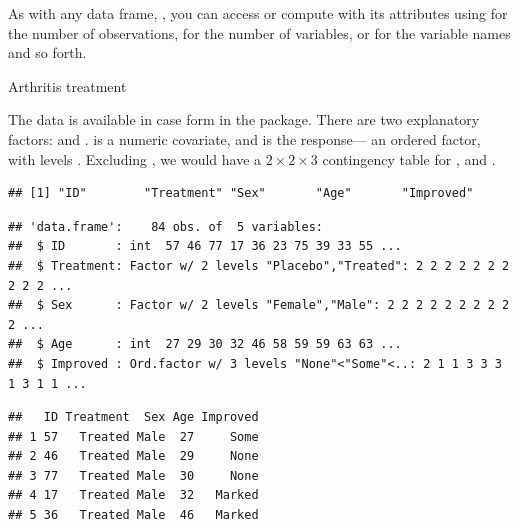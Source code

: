\documentclass[11pt]{book}
\renewenvironment{knitrout}{\small\renewcommand{\baselinestretch}{.85}}{} %
\begin{document}
As with any data frame, , you can access or compute with its attributes using  for the number of observations,
 for the number of variables, 
 or  for the variable names and
so forth.

\begin{Example}[ch2-arth]{Arthritis treatment}

The  data is available in case form in the  package. 
There are two explanatory factors:  and . 
is a numeric covariate, and  is the response--- an ordered factor,
with levels 
.
Excluding , we would have
a $2 \times 2 \times 3$ contingency table for ,  and .
\begin{knitrout}\footnotesize
{}\color{fgcolor}\begin{kframe}
\begin{alltt}
 \hlstd{=}\hlstd{)}  
      
\end{alltt}
\begin{verbatim}
## [1] "ID"        "Treatment" "Sex"       "Age"       "Improved"
\end{verbatim}
\begin{alltt}
        
\end{alltt}
\begin{verbatim}
## 'data.frame':	84 obs. of  5 variables:
##  $ ID       : int  57 46 77 17 36 23 75 39 33 55 ...
##  $ Treatment: Factor w/ 2 levels "Placebo","Treated": 2 2 2 2 2 2 2 2 2 2 ...
##  $ Sex      : Factor w/ 2 levels "Female","Male": 2 2 2 2 2 2 2 2 2 2 ...
##  $ Age      : int  27 29 30 32 46 58 59 59 63 63 ...
##  $ Improved : Ord.factor w/ 3 levels "None"<"Some"<..: 2 1 1 3 3 3 1 3 1 1 ...
\end{verbatim}
\begin{alltt}
\hlstd{)}     
\end{alltt}
\begin{verbatim}
##   ID Treatment  Sex Age Improved
## 1 57   Treated Male  27     Some
## 2 46   Treated Male  29     None
## 3 77   Treated Male  30     None
## 4 17   Treated Male  32   Marked
## 5 36   Treated Male  46   Marked
\end{verbatim}
\end{kframe}
\end{knitrout}
\end{Example}
\end{document}
